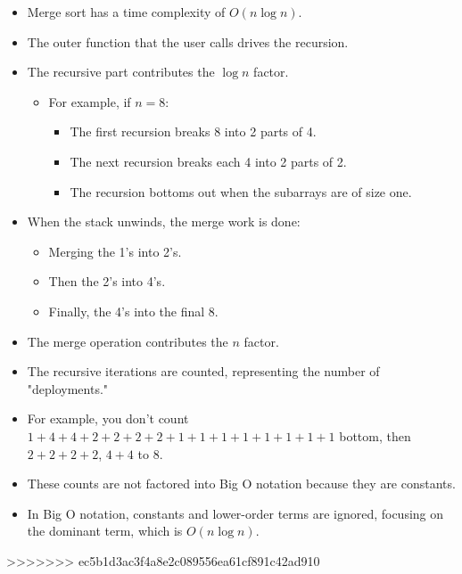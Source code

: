 \begin{itemize}
    \item Merge sort has a time complexity of \(O(n \log n)\).
    \item The outer function that the user calls drives the recursion.
    \item The recursive part contributes the \(\log n\) factor.
    \begin{itemize}
        \item For example, if \(n = 8\):
        \begin{itemize}
            \item The first recursion breaks 8 into 2 parts of 4.
            \item The next recursion breaks each 4 into 2 parts of 2.
            \item The recursion bottoms out when the subarrays are of size one.
        \end{itemize}
    \end{itemize}
    \item When the stack unwinds, the merge work is done:
    \begin{itemize}
        \item Merging the 1's into 2's.
        \item Then the 2's into 4's.
        \item Finally, the 4's into the final 8.
    \end{itemize}
    \item The merge operation contributes the \(n\) factor.
    \item The recursive iterations are counted, representing the number of "deployments."
    \item For example, you don't count \(1 + 4 + 4 + 2 + 2 + 2 + 2 + 1 + 1 + 1 + 1 + 1 + 1 + 1 + 1\) bottom, then \(2 + 2 + 2 + 2\), \(4 + 4\) to 8.
    \item These counts are not factored into Big O notation because they are constants.
    \item In Big O notation, constants and lower-order terms are ignored, focusing on the dominant term, which is \(O(n \log n)\).
\end{itemize}


>>>>>>> ec5b1d3ac3f4a8e2c089556ea61cf891c42ad910
